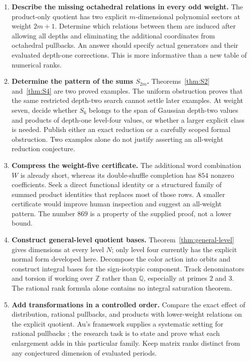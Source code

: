 \documentclass[11pt]{article}
\numberwithin{equation}{section}
\theoremstyle{plain}
\theoremstyle{definition}
\theoremstyle{remark}
\newcommand{\Q}{\mathbb Q}
\newcommand{\Z}{\mathbb Z}
\begin{document}
\begin{enumerate}[leftmargin=*,itemsep=5pt]
\item \textbf{Describe the missing octahedral relations in every odd weight.}
The product-only quotient has two explicit $m$-dimensional polynomial
sectors at weight $2m+1$. Determine which relations between them are
induced after allowing all depths and eliminating the additional
coordinates from octahedral pullbacks. An answer should specify actual
generators and their evaluated depth-one corrections. This is more
informative than a new table of numerical ranks.

\item \textbf{Determine the pattern of the sums $S_{2m}$.}
Theorems~\ref{thm:S2} and~\ref{thm:S4} are two proved examples.
The uniform obstruction proves that the same restricted depth-two
search cannot settle later examples. At weight seven, decide whether
$S_6$ belongs to the span of Gaussian depth-two values and products of
depth-one level-four values, or whether a larger explicit class is
needed. Publish either an exact reduction or a carefully scoped formal
obstruction. Two examples alone do not justify asserting an all-weight
reduction conjecture.

\item \textbf{Compress the weight-five certificate.}
The additional word combination $W$ is already short, whereas its
double-shuffle completion has $854$ nonzero coefficients. Seek a direct
functional identity or a structured family of summed product identities
that replaces most of those rows. A smaller certificate would improve
human inspection and suggest an all-weight pattern. The number $869$
is a property of the supplied proof, not a lower bound.

\item \textbf{Construct general-level quotient bases.}
Theorem~\ref{thm:general-level} gives dimensions at every level $N$;
only level four currently has the explicit normal form developed here.
Decompose the color action into orbits and construct integral bases
for the sign-isotypic component. Track denominators and torsion if
working over $\Z$ rather than $\Q$, especially at primes $2$ and $3$.
The rational rank formula alone contains no integral saturation theorem.

\item \textbf{Add transformations in a controlled order.}
Compare the exact effect of distribution, rational pullbacks, and
products with lower-weight relations on the explicit quotient.
Au's framework supplies a systematic setting for rational pullbacks
\cite{Au}; the research task is to state and prove what each enlargement
adds in this particular family. Keep matrix ranks distinct from any
conjectured dimension of evaluated periods.


\end{enumerate}
\end{document}

